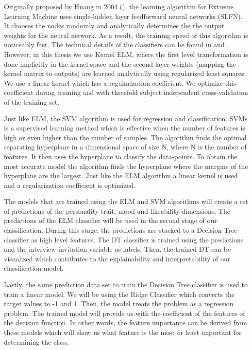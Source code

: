Originally proposed by Huang in 2004 (\cite{huang2004extreme}), the learning algorithm for Extreme Learning Machine uses single-hidden layer feedforward neural networks (SLFN). It chooses the nodes randomly and analytically determines the the output weights for the neural network. As a result, the training speed of this algorithm is noticeably fast. The technical details of the classifiers can be found in \cite{huang2004extreme} and \cite{huang2006extreme}. However, in this thesis we use Kernel ELM, where the first level transformation is done implicitly in the kernel space and the second layer weights (mapping the kernel matrix to outputs) are learned analytically using regularized least squares. We use a linear kernel which has a regularization coefficient. We optimize this coefficient during training and with threefold subject independent cross-validation of the training set. 

Just like ELM, the SVM algorithm is used for regression and classification. SVMs is a supervised learning method which is effective when the number of features is high or even higher than the number of samples. The algorithm finds the optimal separating hyperplane in a dimensional space of size N, where N is the number of features. It then uses the hyperplane to classify the data-points. To obtain the most accurate model the algorithm finds the hyperplane where the margins of the hyperplane are the largest. Just like the ELM algorithm a linear kernel is used and a regularization coefficient is optimized. 

The models that are trained using the ELM and SVM algorithms will create a set of predictions of the personality trait, mood and likeability dimensions. The predictions of the ELM classifier will be used in the second stage of our classification. During this stage, the predictions are stacked to a Decision Tree classifier as high level features. The DT classifier is trained using the predictions and the interview invitation variable as labels. Then, the trained DT can be visualized which contributes to the explainability and interpretability of our classification model.

Lastly, the same prediction data set to train the Decision Tree classifier is used to train a linear model. We will be using the Ridge Classifier which converts the target values to -1 and 1. Then, the model treats the problem as a regression problem. The trained model will provide us with the coefficient of the features of the decision function. In other words, the feature importance can be derived from these models which will show us what feature is the most or least important for determining the class.



